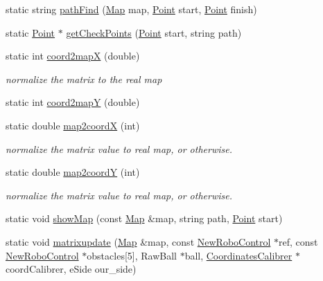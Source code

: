 \begin{DoxyCompactItemize}
\item 
static string \hyperlink{classInterpreter_a253118e59d7428286ff70a818efe0c52}{pathFind} (\hyperlink{classMatrix}{Map} map, \hyperlink{structInterpreter_1_1Point}{Point} start, \hyperlink{structInterpreter_1_1Point}{Point} finish)
\item 
static \hyperlink{structInterpreter_1_1Point}{Point} $\ast$ \hyperlink{classInterpreter_a17b252478116fc19ab8fe4623728cda8}{getCheckPoints} (\hyperlink{structInterpreter_1_1Point}{Point} start, string path)
\item 
static int \hyperlink{classInterpreter_a36e1b3f28a3d8dae2155f1f0212bed7d}{coord2mapX} (double)
\begin{DoxyCompactList}\small\item\em normalize the matrix to the real map \item\end{DoxyCompactList}\item 
static int \hyperlink{classInterpreter_a5b597351a6bdaf23fbf42aed910b151f}{coord2mapY} (double)
\item 
static double \hyperlink{classInterpreter_afaaf3930191f9ba3e48a09af193e0a39}{map2coordX} (int)
\begin{DoxyCompactList}\small\item\em normalize the matrix value to real map, or otherwise. \item\end{DoxyCompactList}\item 
static double \hyperlink{classInterpreter_abd0885c42ade8eb7f941c8d4b26a2501}{map2coordY} (int)
\begin{DoxyCompactList}\small\item\em normalize the matrix value to real map, or otherwise. \item\end{DoxyCompactList}\item 
static void \hyperlink{classInterpreter_ae09346bdc7e055a43f760cb2b868357f}{showMap} (const \hyperlink{classMatrix}{Map} \&map, string path, \hyperlink{structInterpreter_1_1Point}{Point} start)
\item 
static void \hyperlink{classInterpreter_a4b195c13b5189f82d5b2ccd47ee4c562}{matrixupdate} (\hyperlink{classMatrix}{Map} \&map, const \hyperlink{classNewRoboControl}{NewRoboControl} $\ast$ref, const \hyperlink{classNewRoboControl}{NewRoboControl} $\ast$obstacles\mbox{[}5\mbox{]}, RawBall $\ast$ball, \hyperlink{classCoordinatesCalibrer}{CoordinatesCalibrer} $\ast$coordCalibrer, eSide our\_\-side)

\end{DoxyCompactItemize}
